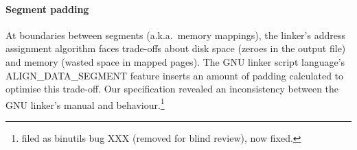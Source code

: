 \documentclass[preprint,10pt]{sigplanconf-pldi16}
\begin{document}


\paragraph{Segment padding}
At boundaries between segments (a.k.a.\ memory mappings), 
the linker's address assignment algorithm 
faces trade-offs about disk space (zeroes in the output file)
and memory (wasted space in mapped pages).
The GNU linker script language's 
\textsf{ALIGN\_DATA\_SEGMENT} feature 
inserts an amount of padding calculated to optimise this trade-off.
Our specification revealed an inconsistency between the GNU linker's 
manual and behaviour.\footnote{filed as binutils bug XXX (removed for blind review), now fixed.}


\end{document}
